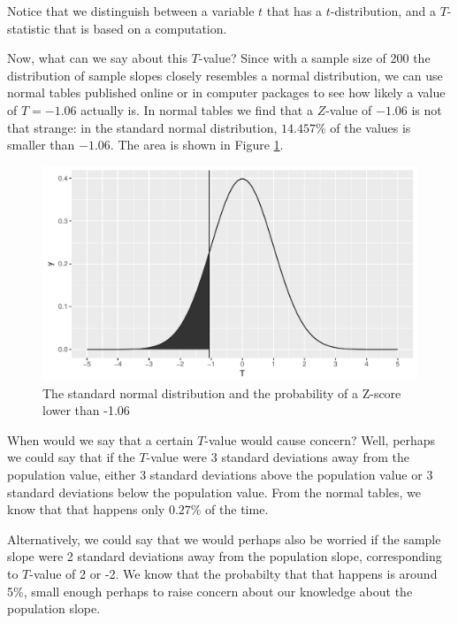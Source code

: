 \documentclass[]{report}\usepackage[]{graphicx}\usepackage[]{color}
\makeatletter
\def\maxwidth{ %
  \ifdim\Gin@nat@width>\linewidth
    \linewidth
  \else
    \Gin@nat@width
  \fi
}
\newenvironment{knitrout}{}{} %
\makeatother
\begin{document}
Notice that we distinguish between a variable $t$ that has a $t$-distribution, and a $T$-statistic that is based on a computation.


Now, what can we say about this $T$-value? Since with a sample size of 200 the distribution of sample slopes closely resembles a normal distribution, we can use normal tables published online or in computer packages to see how likely a value of $T=-1.06$ actually is. In normal tables we find that a $Z$-value of $-1.06$ is not that strange: in the standard normal distribution, $14.457$\% of the values is smaller than $-1.06$. The area is shown in Figure \ref{fig:inf_9b}.


\begin{knitrout}
\color{fgcolor}\begin{figure}

{\centering \includegraphics[width=\maxwidth]{figure/inf_9b-1} 

}

\caption[The standard normal distribution and the probability of a Z-score lower than -1.06]{The standard normal distribution and the probability of a Z-score lower than -1.06}\label{fig:inf_9b}
\end{figure}


\end{knitrout}


When would we say that a certain $T$-value would cause concern? Well, perhaps we could say that if the $T$-value were 3 standard deviations away from the population value, either 3 standard deviations above the population value or 3 standard deviations below the population value. From the normal tables, we know that that happens only $0.27$\% of the time.

Alternatively, we could say that we would perhaps also be worried if the sample slope were 2 standard deviations away from the population slope, corresponding to $T$-value of 2 or -2. We know that the probabilty that that happens is around 5\%, small enough perhaps to raise concern about our knowledge about the population slope.
\end{document}
